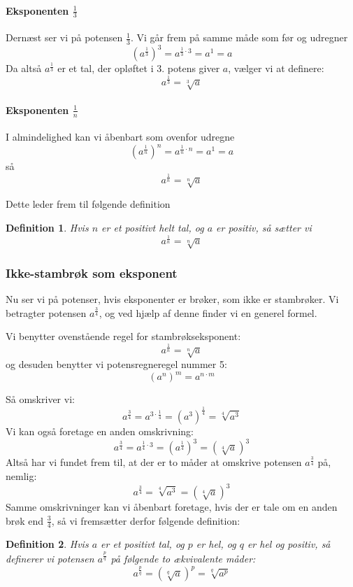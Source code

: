 \documentclass[12pt,oneside,a4paper]{article}
\theoremstyle{plain}
\newtheorem*{mydef}{Definition}
\begin{document}
\paragraph*{Eksponenten $\frac13$}
Dernæst ser vi på potensen $\frac13$. Vi går frem på samme måde som før og
udregner
$$
\left(a^{\frac13}\right)^3 = a^{\frac13 \cdot 3} = a^1 = a
$$
Da altså $a^\frac13$ er et tal, der opløftet i 3. potens giver $a$, vælger vi
at definere:
$$
a^\frac13 = \sqrt[3]{a}
$$

\paragraph*{Eksponenten $\frac1n$}
I almindelighed kan vi åbenbart som ovenfor udregne
$$
\left(a^{\frac1n}\right)^n = a^{\frac1n \cdot n} = a^1 = a
$$
så
$$
a^\frac1n = \sqrt[n]{a}
$$

Dette leder frem til følgende definition
\begin{mydef}
    Hvis $n$ er et positivt helt tal, og $a$ er positiv, så sætter vi
    $$
    a^\frac1n = \sqrt[n]{a}
    $$
\end{mydef}

\subsubsection*{Ikke-stambrøk som eksponent}
Nu ser vi på potenser, hvis eksponenter er brøker, som ikke er stambrøker.
Vi betragter potensen $a^{\frac34}$, og ved hjælp af denne finder vi en generel
formel.

Vi benytter ovenstående regel for stambrøkseksponent:
$$
a^\frac1n = \sqrt[n]{a}
$$
og desuden benytter vi potensregneregel nummer 5:
$$
\left(a^n\right)^m = a^{n\cdot m}
$$

Så omskriver vi:
$$
a^{\frac34} = a^{3\cdot \frac14} = \left(a^3\right)^\frac14 = \sqrt[4]{a^3}
$$
Vi kan også foretage en anden omskrivning:
$$
a^{\frac34} = a^{\frac14 \cdot 3} = \left(a^\frac14\right)^3 =
\left(\sqrt[4]{a}\right)^3
$$
Altså har vi fundet frem til, at der er to måder at omskrive potensen $a^\frac34$ på, nemlig:
$$
a^\frac34 = \sqrt[4]{a^3} = \left(\sqrt[4]{a}\right)^3
$$
Samme omskrivninger kan vi åbenbart foretage, hvis der er tale om en anden brøk
end $\frac34$, så vi fremsætter derfor følgende definition:
\begin{mydef}
    Hvis $a$ er et positivt tal, og $p$ er hel, og $q$ er hel og positiv, så
    definerer vi potensen $a^\frac{p}{q}$ på følgende to ækvivalente måder:
    $$
    a^\frac{p}{q} = \left(\sqrt[q]{a}\right)^p = \sqrt[q]{a^p}
    $$
\end{mydef}
\end{document}
